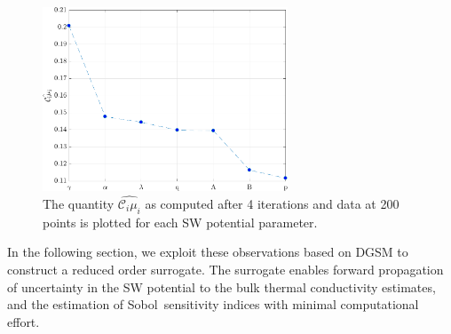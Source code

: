 \begin{figure}[htbp]
 \begin{center}
  \includegraphics[width=0.65\textwidth]{./Figures/ub}
\caption{The quantity $\hat{\mathcal{C}_i\mu_i}$ as computed after 4 iterations and data at 200
points is plotted for each SW potential parameter.}
\label{fig:ub}
\end{center}
\end{figure}

In the following section, we exploit these observations based on DGSM to construct a reduced order surrogate.
The surrogate enables forward propagation of uncertainty in the SW potential to the bulk thermal conductivity 
estimates, and the estimation of Sobol\textquotesingle~sensitivity indices with minimal computational effort. 




























